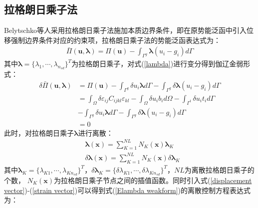 \subsection{拉格朗日乘子法}
Belytschko等人采用拉格朗日乘子法施加本质边界条件，即在原势能泛函中引入位移强制边界条件对应的约束项，拉格朗日乘子法的势能泛函表达式为：
\begin{equation}\label{Elambda}
\begin{split}
    \bar{\Pi}(\pmb{u},\pmb{\lambda})=\Pi(\pmb{u})-\int_{\Gamma^g}\pmb{\lambda}(u_i-g_i)d\Gamma
\end{split}
\end{equation}   
其中$\pmb{\lambda}=\{\lambda_1,\dotsb,\lambda_{n_{sd}}\}^T$为拉格朗日乘子，对式(\ref{lambda})进行变分得到伽辽金弱形式：
\begin{equation}\label{Elambda weakform}
\begin{split}
        \delta\bar{\Pi}(\pmb{u},\pmb{\lambda})&=\Pi(\pmb{u})-\int_{\Gamma^g}\delta u_i\pmb{\lambda}d\Gamma-\int_{\Gamma^g}\delta\pmb{\lambda}(u_i-g_i)d\Gamma\\
       &=\int_{\Omega}\delta\varepsilon_{ij}C_{ijkl}\varepsilon_{kl}-\int_{\Omega}\delta u_ib_id\Omega-\int_{\Gamma^t}\delta u_it_id\Gamma\\
       &-\int_{\Gamma^g}\delta u_i\pmb{\lambda}d\Gamma-\int_{\Gamma^g}\delta\pmb{\lambda}(u_i-g_i)d\Gamma\\
       &=0
\end{split}
\end{equation} 
此时，对拉格朗日乘子$\pmb{\lambda}$进行离散：
\begin{equation}
\begin{split}
    &\pmb{\lambda}(\pmb{x})=\sum_{K=1}^{N\!L}N_K(\pmb{x})\pmb \lambda_K\\
&\delta\pmb{\lambda}(\pmb{x})=\sum_{K=1}^{N\!L}N_K(\pmb{x})\delta\pmb \lambda_K
\end{split}
\end{equation}
其中$\pmb \lambda_K=\{\lambda_{K1},\dotsb,\lambda_{Kn_{sd}}\}^T$，$\delta\pmb \lambda_K=\{\delta\lambda_{K1},\dotsb,\delta\lambda_{Kn_{sd}}\}^T$，$NL$为离散拉格朗日乘子的个数，
$N_K(\pmb{x})$为拉格朗日乘子节点之间的插值函数。同时引入式(\ref{displacement vector})-(\ref{strain vector})可以得到式(\ref{Elambda weakform})的离散控制方程表达式为：
